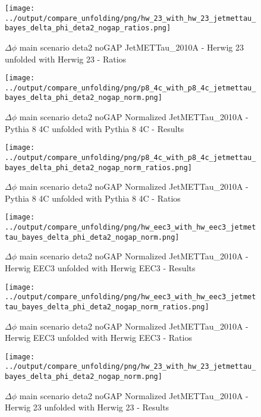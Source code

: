 \documentclass[11pt]{book}
\begin{document}
\begin{figure}[ht]
\centering
\texttt{[image: ../output/compare\_unfolding/png/hw\_23\_with\_hw\_23\_jetmettau\_bayes\_delta\_phi\_deta2\_nogap\_ratios.png]}
\caption{$\Delta\phi$ main scenario deta2 noGAP JetMETTau\_2010A - Herwig 23 unfolded with Herwig 23 - Ratios}
\label{hw_23_hw_23_jetmettau_bayes_delta_phi_deta2_nogap_b}
\end{figure}


\begin{figure}[ht]
\centering
\texttt{[image: ../output/compare\_unfolding/png/p8\_4c\_with\_p8\_4c\_jetmettau\_bayes\_delta\_phi\_deta2\_nogap\_norm.png]}
\caption{$\Delta\phi$ main scenario deta2 noGAP Normalized JetMETTau\_2010A - Pythia 8 4C unfolded with Pythia 8 4C - Results}
\label{p8_p8_jetmettau_bayes_delta_phi_deta2_nogap_norm_a}
\end{figure}

\begin{figure}[ht]
\centering
\texttt{[image: ../output/compare\_unfolding/png/p8\_4c\_with\_p8\_4c\_jetmettau\_bayes\_delta\_phi\_deta2\_nogap\_norm\_ratios.png]}
\caption{$\Delta\phi$ main scenario deta2 noGAP Normalized JetMETTau\_2010A - Pythia 8 4C unfolded with Pythia 8 4C - Ratios}
\label{p8_p8_jetmettau_bayes_delta_phi_deta2_nogap_norm_b}
\end{figure}

\begin{figure}[ht]
\centering
\texttt{[image: ../output/compare\_unfolding/png/hw\_eec3\_with\_hw\_eec3\_jetmettau\_bayes\_delta\_phi\_deta2\_nogap\_norm.png]}
\caption{$\Delta\phi$ main scenario deta2 noGAP Normalized JetMETTau\_2010A - Herwig EEC3 unfolded with Herwig EEC3 - Results}
\label{hw_eec3_hw_eec3_jetmettau_bayes_delta_phi_deta2_nogap_norm_a}
\end{figure}

\begin{figure}[ht]
\centering
\texttt{[image: ../output/compare\_unfolding/png/hw\_eec3\_with\_hw\_eec3\_jetmettau\_bayes\_delta\_phi\_deta2\_nogap\_norm\_ratios.png]}
\caption{$\Delta\phi$ main scenario deta2 noGAP Normalized JetMETTau\_2010A - Herwig EEC3 unfolded with Herwig EEC3 - Ratios}
\label{hw_eec3_hw_eec3_jetmettau_bayes_delta_phi_deta2_nogap_norm_b}
\end{figure}

\begin{figure}[ht]
\centering
\texttt{[image: ../output/compare\_unfolding/png/hw\_23\_with\_hw\_23\_jetmettau\_bayes\_delta\_phi\_deta2\_nogap\_norm.png]}
\caption{$\Delta\phi$ main scenario deta2 noGAP Normalized JetMETTau\_2010A - Herwig 23 unfolded with Herwig 23 - Results}
\label{hw_23_hw_23_jetmettau_bayes_delta_phi_deta2_nogap_norm_a}
\end{figure}
\end{document}
